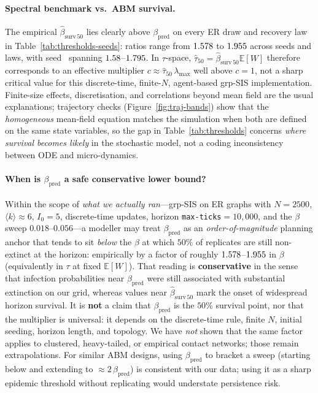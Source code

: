 \documentclass[11pt,a4paper]{article}
\begin{document}
\paragraph{Spectral benchmark vs.\ ABM survival.}
The empirical $\hat{\beta}_{\mathrm{surv}\,50}$ lies clearly above $\beta_{\mathrm{pred}}$ on every ER draw and recovery law in Table~\ref{tab:thresholds-seeds}: ratios range from $1.578$ to $1.955$ across seeds and laws, with seed~\RepPrimarySeed{} spanning $1.58$--$1.795$. In $\tau$-space, $\hat{\tau}_{50}=\hat{\beta}_{\mathrm{surv}\,50}\mathbb{E}[W]$ therefore corresponds to an effective multiplier $c\approx \hat{\tau}_{50}\,\lambda_{\max}$ well above $c{=}1$, not a sharp critical value for this discrete-time, finite-$N$, agent-based grp-SIS implementation. Finite-size effects, discretisation, and correlations beyond mean field are the usual explanations; trajectory checks (Figure~\ref{fig:traj-bands}) show that the \emph{homogeneous} mean-field equation matches the simulation when both are defined on the same state variables, so the gap in Table~\ref{tab:thresholds} concerns \emph{where survival becomes likely} in the stochastic model, not a coding inconsistency between ODE and micro-dynamics.

\paragraph{When is $\beta_{\mathrm{pred}}$ a safe conservative lower bound?}
Within the scope of \emph{what we actually ran}---grp-SIS on ER graphs with $N{=}2500$, $\langle k\rangle\approx 6$, $I_0{=}5$, discrete-time updates, horizon \texttt{max-ticks}${}=10{,}000$, and the $\beta$ sweep $0.018$--$0.056$---a modeller may treat $\beta_{\mathrm{pred}}$ as an \emph{order-of-magnitude} planning anchor that tends to sit \emph{below} the $\beta$ at which $50\%$ of replicates are still non-extinct at the horizon: empirically by a factor of roughly $1.578$--$1.955$ in $\beta$ (equivalently in $\tau$ at fixed $\mathbb{E}[W]$). That reading is \textbf{conservative} in the sense that infection probabilities near $\beta_{\mathrm{pred}}$ were still associated with substantial extinction on our grid, whereas values near $\hat{\beta}_{\mathrm{surv}\,50}$ mark the onset of widespread horizon survival. It is \textbf{not} a claim that $\beta_{\mathrm{pred}}$ is the $50\%$ survival point, nor that the multiplier is universal: it depends on the discrete-time rule, finite $N$, initial seeding, horizon length, and topology. We have \emph{not} shown that the same factor applies to clustered, heavy-tailed, or empirical contact networks; those remain extrapolations. For similar ABM designs, using $\beta_{\mathrm{pred}}$ to bracket a sweep (starting below and extending to $\approx 2\,\beta_{\mathrm{pred}}$) is consistent with our data; using it as a sharp epidemic threshold without replicating would understate persistence risk.
\end{document}
